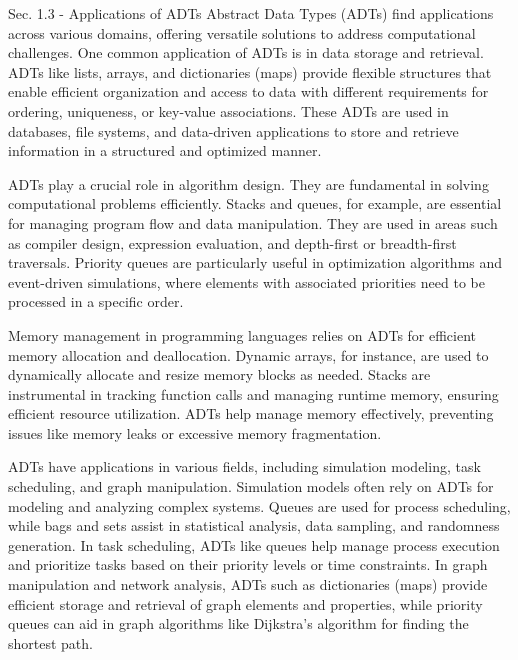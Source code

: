\begin{notes}{Sec. 1.3 - Applications of ADTs}
    Abstract Data Types (ADTs) find applications across various domains, offering versatile solutions to address computational challenges. One common application of ADTs is in data storage and retrieval. ADTs like lists,
    arrays, and dictionaries (maps) provide flexible structures that enable efficient organization and access to data with different requirements for ordering, uniqueness, or key-value associations. These ADTs are used in
    databases, file systems, and data-driven applications to store and retrieve information in a structured and optimized manner.
    
    ADTs play a crucial role in algorithm design. They are fundamental in solving computational problems efficiently. Stacks and queues, for example, are essential for managing program flow and data manipulation.
    They are used in areas such as compiler design, expression evaluation, and depth-first or breadth-first traversals. Priority queues are particularly useful in optimization algorithms and event-driven simulations, where
    elements with associated priorities need to be processed in a specific order.
    
    Memory management in programming languages relies on ADTs for efficient memory allocation and deallocation. Dynamic arrays, for instance, are used to dynamically allocate and resize memory blocks as needed.
    Stacks are instrumental in tracking function calls and managing runtime memory, ensuring efficient resource utilization. ADTs help manage memory effectively, preventing issues like memory leaks or excessive memory 
    fragmentation.
    
    ADTs have applications in various fields, including simulation modeling, task scheduling, and graph manipulation. Simulation models often rely on ADTs for modeling and analyzing complex systems. Queues are used
    for process scheduling, while bags and sets assist in statistical analysis, data sampling, and randomness generation. In task scheduling, ADTs like queues help manage process execution and prioritize tasks based on their
    priority levels or time constraints. In graph manipulation and network analysis, ADTs such as dictionaries (maps) provide efficient storage and retrieval of graph elements and properties, while priority queues can aid in
    graph algorithms like Dijkstra's algorithm for finding the shortest path.
\end{notes}